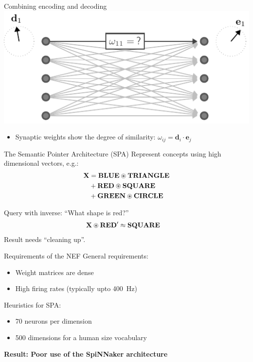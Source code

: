 \documentclass[handout,t]{beamer}
\renewcommand{\vec}{\mathbf}
\newcommand{\semanticpointer}{\textbf}
\newcommand{\msemanticpointer}[1]{\mbox{\semanticpointer{#1}}}
\begin{document}
  \begin{frame}{Combining encoding and decoding}
    \includegraphics[width=\textwidth]{weight_matrices}

    \begin{itemize}
      \item Synaptic weights show the degree of similarity: $\omega_{ij} = \vec{d}_i \cdot \vec{e}_j$
    \end{itemize}
  \end{frame}

  \begin{frame}{The Semantic Pointer Architecture (SPA)}
    Represent concepts using high dimensional vectors, e.g.:
    \begin{align*}
      \msemanticpointer{X} &= \msemanticpointer{BLUE}\circledast\msemanticpointer{TRIANGLE} \\
                           &+ \msemanticpointer{RED}\circledast\msemanticpointer{SQUARE}\\
                           &+ \msemanticpointer{GREEN}\circledast\msemanticpointer{CIRCLE}
    \end{align*}

    Query with inverse: ``What shape is red?''
    \begin{align*}
      \msemanticpointer{X} \circledast \msemanticpointer{RED}^\prime &\approx \msemanticpointer{SQUARE}
    \end{align*}
    Result needs ``cleaning up''.
  \end{frame}

  \begin{frame}{Requirements of the NEF}
    General requirements:
    \begin{itemize}
      \item Weight matrices are dense
      \item High firing rates (typically upto \SI{400}{\hertz})
    \end{itemize}

    Heuristics for SPA:
    \begin{itemize}
      \item 70 neurons per dimension
      \item 500 dimensions for a human size vocabulary
    \end{itemize}
    \pause
    \textbf{Result: Poor use of the SpiNNaker architecture}
  \end{frame}
\end{document}
